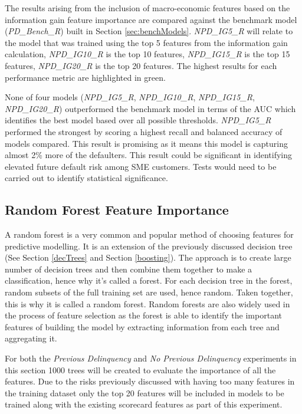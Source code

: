 The results arising from the inclusion of macro-economic features based on the information gain feature importance are compared against the benchmark model (\textit{PD\_Bench\_R}) built in Section \ref{sec:benchModels}. \textit{NPD\_IG5\_R} will relate to the model that was trained using the top 5 features from the information gain calculation, \textit{NPD\_IG10\_R} is the top 10 features, \textit{NPD\_IG15\_R} is the top 15 features, \textit{NPD\_IG20\_R} is the top 20 features. The highest results for each performance metric are highlighted in green.

None of four models (\textit{NPD\_IG5\_R}, \textit{NPD\_IG10\_R}, \textit{NPD\_IG15\_R}, \textit{NPD\_IG20\_R}) outperformed the benchmark model in terms of the AUC which identifies the best model based over all possible thresholds. \textit{NPD\_IG5\_R} performed the strongest by scoring a highest recall and balanced accuracy of models compared. This result is promising as it means this model is capturing almost 2\% more of the defaulters. This result could be significant in identifying elevated future default risk among SME customers. Tests would need to be carried out to identify statistical significance.


\subsection{Random Forest Feature Importance}
A random forest is a very common and popular method of choosing features for predictive modelling. It is an extension of the previously discussed decision tree (See Section \ref{decTrees} and Section \ref{boosting}). The approach is to create large number of decision trees and then combine them together to make a classification, hence why it's called a forest. For each decision tree in the forest, random subsets of the full training set are used, hence random. Taken together, this is why it is called a random forest. Random forests are also widely used in the process of feature selection as the forest is able to identify the important features of building the model by extracting information from each tree and aggregating it.

For both the \textit{Previous Delinquency} and \textit{No Previous Delinquency} experiments in this section 1000 trees will be created to evaluate the importance of all the features. Due to the risks previously discussed
with having too many features in the training dataset only the top 20 features will be
included in models to be trained along with the existing scorecard features as part of this experiment. 


